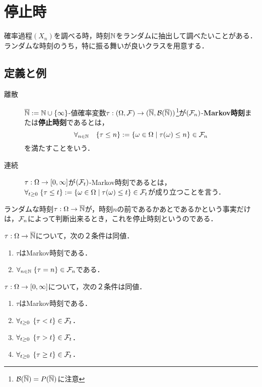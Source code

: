 \documentclass[uplatex,dvipdfmx]{jsreport}
\begin{document}
\section{停止時}

\begin{tcolorbox}[colframe=ForestGreen, colback=ForestGreen!10!white,breakable,colbacktitle=ForestGreen!40!white,coltitle=black,fonttitle=\bfseries\sffamily,
title=]
    確率過程$(X_n)$を調べる時，時刻$\mathbb{N}$をランダムに抽出して調べたいことがある．
    ランダムな時刻のうち，特に振る舞いが良いクラスを用意する．
\end{tcolorbox}

\subsection{定義と例}

\begin{definition}\mbox{}
    \begin{description}
        \item[離散]$\overline{\mathbb{N}}:=\mathbb{N}\cup\{\infty\}$-値確率変数$\tau:(\Omega,\mathcal{F})\to(\overline{\mathbb{N}},\mathcal{B}(\overline{\mathbb{N}}))$\footnote{$\mathcal{B}(\overline{\mathbb{N}})=P(\overline{\mathbb{N}})$に注意}が$(\mathcal{F}_n)$-\textbf{Markov時刻}または\textbf{停止時刻}であるとは，
        \[\forall_{n\in\mathbb{N}}\quad\{\tau\le n\}:=\left\{\omega\in\Omega\mid\tau(\omega)\le n\right\}\in\mathcal{F}_n\]
        を満たすことをいう．
        \item[連続] $\tau:\Omega\to[0,\infty]$が$(\mathcal{F}_t)$-Markov時刻であるとは，$\forall_{t\ge0}\;\{\tau\le t\}:=\left\{\omega\in\Omega\mid\tau(\omega)\le t\right\}\in\mathcal{F}_t$が成り立つことを言う．
    \end{description}
\end{definition}
\begin{remarks}
    ランダムな時刻$\tau:\Omega\to\overline{\mathbb{N}}$が，時刻$n$の前であるかあとであるかという事実だけは，$\mathcal{F}_n$によって判断出来るとき，これを停止時刻というのである．
\end{remarks}

\begin{lemma}[離散の場合の特徴付け]
    $\tau:\Omega\to\overline{\mathbb{N}}$について，次の２条件は同値．
    \begin{enumerate}
        \item $\tau$はMarkov時刻である．
        \item $\forall_{n\in\mathbb{N}}\;\{\tau=n\}\in\mathcal{F}_n$である．
    \end{enumerate}
\end{lemma}

\begin{lemma}
    $\tau:\Omega\to[0,\infty]$について，次の２条件は同値．
    \begin{enumerate}
        \item $\tau$はMarkov時刻である．
        \item $\forall_{t\ge0}\;\left\{\tau<t\right\}\in\mathcal{F}_t$．
        \item $\forall_{t\ge0}\;\left\{\tau>t\right\}\in\mathcal{F}_t$．
        \item $\forall_{t\ge0}\;\left\{\tau\ge t\right\}\in\mathcal{F}_t$．
    \end{enumerate}
\end{lemma}
\end{document}
